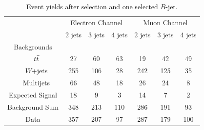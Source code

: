 \begin{table}[!h!tbp]
\begin{center}
\caption{Event yields after selection and one selected $B$-jet.}
\label{onetag-yields}
\begin{tabular}{c|ccc|ccc}
& \multicolumn{3}{c|}{Electron Channel} & \multicolumn{3}{c}{Muon Channel} \\
                         & 2 jets & 3 jets & 4 jets
                         & 2 jets & 3 jets & 4 jets \\
\hline
Backgrounds              	&      		&      	 	&      		&      		&      		&      		\\
~~$\mbox{$t\bar{t}$}$				&	27	&	60	&	63	&	19	&	42	&	49	\\
~~$W$+jets			&	255	&	106	&	28	&	242	&	125	&	35	\\
~~Multijets              		&	66 	&   48 	&   18 	& 26 		&   24 	&    8		\\
\hline                                                                            
Expected Signal		& 	18	&	9	&	3	&	14	&	7	& 2		\\
Background Sum           	&  	348	&  213 	&  110 	& 286 	&  191 	&   93	\\
\hline                                                                            
Data                     		&  	357 	&  207 	&   97 	&	287 	&  179 	&  100
\end{tabular}
\vspace{-0.1in}
\end{center}
\end{table}

